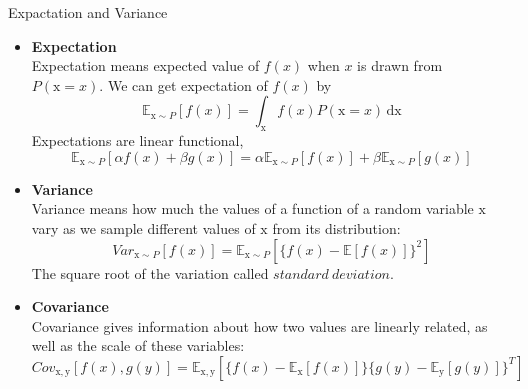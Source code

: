\documentclass{bredelebeamer}
\begin{document}
\begin{frame}{Expactation and Variance}
  \begin{itemize}
    \item\begin{justify}
      \textbf{Expectation}\\
      Expectation means expected value of $f(x)$ when $x$ is drawn from $P(\mathrm{x}=x)$.
      We can get expectation of $f(x)$ by
      \begin{equation}
        \mathbb{E}_{\mathrm{x} \sim P} [f(x)] = \int_\mathrm{x} f(x)P(\mathrm{x}=x)\,\mathrm{dx}
      \end{equation}
      Expectations are linear functional,
      \begin{equation}
        \mathbb{E}_{\mathrm{x} \sim P} [\alpha f(x) + \beta g(x)]
          = \alpha \mathbb{E}_{\mathrm{x} \sim P} [f(x)] + \beta \mathbb{E}_{\mathrm{x} \sim P} [g(x)]
      \end{equation}
    \end{justify}
    \item\begin{justify}
    \textbf{Variance}\\
    Variance means how much the values of a function of a random variable
    $\mathrm{x}$ vary as we sample different values of $\mathrm{x}$ from its
    distribution:
    \begin{equation}
      \mathit{Var}_{\mathrm{x} \sim P} [f(x)] = \mathbb{E}_{\mathrm{x} \sim P} [\{ f(x) - \mathbb{E}[f(x)] \} ^2]
    \end{equation}
    The square root of the variation called $\mathit{standard\ deviation}$.\\
    \end{justify}
    \item\begin{justify}
    \textbf{Covariance}\\
    Covariance gives information about how two values are linearly related, as well as
    the scale of these variables:
    \begin{equation}
      \mathit{Cov}_{\mathrm{x}, \mathrm{y}} [f(x), g(y)]
      = \mathbb{E}_{\mathrm{x}, \mathrm{y}} [\{ f(x) - \mathbb{E}_{\mathrm{x}}[f(x)] \} \{ g(y) - \mathbb{E}_{\mathrm{y}}[g(y)] \} ^T]
    \end{equation}
    \end{justify}
  \end{itemize}
\end{frame}
\end{document}
